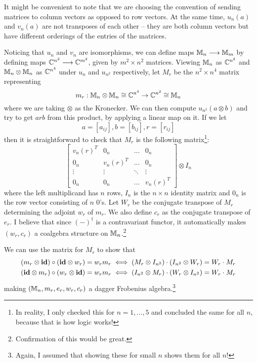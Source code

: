 \begin{rmk}
It might be convenient to note that we are choosing the convention of sending
matrices to column vectors as opposed to row vectors. At the same time, $u_n(a)$
and $v_n(a)$ are not transposes of each other -- they are both column vectors
but have different orderings of the entries of the matrices.
\end{rmk}

Noticing that $u_n$ and $v_n$ are isomorphisms, we can define maps
$\mathbb{M}_n \longrightarrow \mathbb{M}_m$ by defining maps $\mathbb{C}^{n^2} \longrightarrow \mathbb{C}^{m^2}$, given by
$m^2 \times n^2$ matrices. Viewing $\mathbb{M}_n$ as $\mathbb{C}^{n^2}$ and $\mathbb{M}_n \otimes \mathbb{M}_n$
as $\mathbb{C}^{n^4}$ under $u_n$ and $u_{n^2}$ respectively, let $M_r$ be the
$n^2 \times n^4$ matrix representing
\[
  m_r : \mathbb{M}_n \otimes \mathbb{M}_n \cong \mathbb{C}^{n^4} \rightarrow \mathbb{C}^{n^2} \cong \mathbb{M}_n
\]
where we are taking $\otimes$ as the Kronecker. We can then compute
$u_{n^2}(a \otimes b)$ and try to get $arb$ from this product, by applying a
linear map on it. If we let
\[
  a = [a_{ij}], b = [b_{ij}], r = [r_{ij}]
\]
then it is straightforward to check that $M_r$ is the following
matrix\footnote{In reality, I only checked this for $n = 1, \dots, 5$ and
concluded the same for all $n$, because that is how logic works!}:
\[
  \begin{bmatrix}
    v_n(r)^T  & 0_n       & \dots   & 0_n     \\
    0_n       & v_n(r)^T  & \dots   & 0_n     \\
    \vdots    & \vdots    & \ddots  & \vdots  \\
    0_n       & 0_n       & \dots   & v_n(r)^T
  \end{bmatrix} \otimes I_{n}
\]
where the left multiplicand has $n$ rows, $I_n$ is the $n \times n$ identity
matrix and $0_n$ is the row vector consisting of $n$ $0$'s. Let
$W_r$ be the conjugate transpose of $M_r$ determining the adjoint $w_r$ of
$m_r$. We also define $c_r$ as the conjugate transpose of $e_r$. I believe that
since $(-)^{\dagger}$ is a contravariant functor, it automatically makes
$(w_r, c_r)$ a coalgebra structure on $\mathbb{M}_n$.\footnote{Confirmation of this
would be great.}

We can use the matrix for $M_r$ to show that
\begin{align*}
  (m_r \otimes \textbf{id}) \circ (\textbf{id} \otimes w_r) = w_rm_r
  &\iff (M_r \otimes I_{n^2}) \cdot (I_{n^2} \otimes W_r) = W_r \cdot M_r\\
  (\textbf{id} \otimes m_r) \circ (w_r \otimes \textbf{id}) = w_rm_r
  &\iff (I_{n^2} \otimes M_r) \cdot (W_r \otimes I_{n^2}) = W_r \cdot M_r
\end{align*}
making $(\mathbb{M}_n, m_r, e_r, w_r, c_r)$ a dagger Frobenius algebra.\footnote{Again,
I assumed that showing these for small $n$ shows them for all $n$!}

